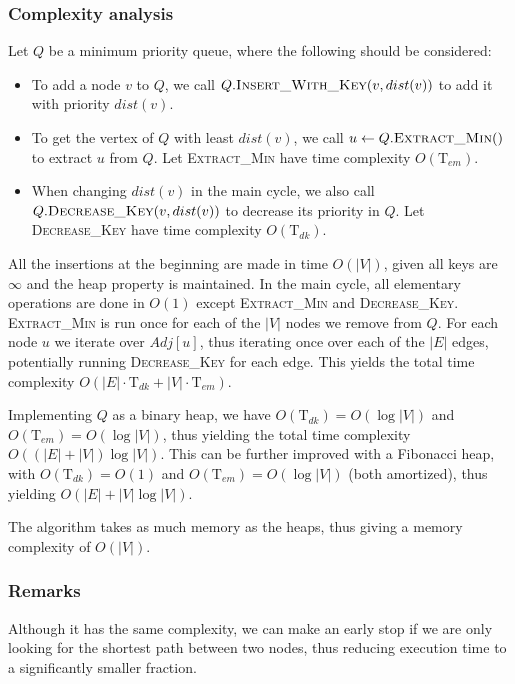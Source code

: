 \subsubsection{Complexity analysis}
Let $Q$ be a minimum priority queue, where the following should be considered:
\begin{itemize}
    \item To add a node $v$ to $Q$, we call $Q.\textsc{Insert\_With\_Key}(v, dist(v))$ to add it with priority $dist(v)$.
    \item To get the vertex of $Q$ with least $dist(v)$, we call $u \gets Q.\textsc{Extract\_Min}()$ to extract $u$ from $Q$. Let \textsc{Extract\_Min} have time complexity $O(\text{T}_{em})$.
    \item When changing $dist(v)$ in the main cycle, we also call $Q.\textsc{Decrease\_Key}(v, dist(v))$ to decrease its priority in $Q$. Let \textsc{Decrease\_Key} have time complexity $O(\text{T}_{dk})$.
\end{itemize}
All the insertions at the beginning are made in time $O(|V|)$, given all keys are $\infty$ and the heap property is maintained. In the main cycle, all elementary operations are done in $O(1)$ except \textsc{Extract\_Min} and \textsc{Decrease\_Key}. \textsc{Extract\_Min} is run once for each of the $|V|$ nodes we remove from $Q$. For each node $u$ we iterate over $Adj[u]$, thus iterating once over each of the $|E|$ edges, potentially running \textsc{Decrease\_Key} for each edge. This yields the total time complexity $O(|E|\cdot \text{T}_{dk}+|V|\cdot \text{T}_{em})$. \par
Implementing $Q$ as a binary heap, we have $O(\text{T}_{dk})=O(\log |V|)$ and $O(\text{T}_{em})=O(\log |V|)$, thus yielding the total time complexity $O((|E|+|V|)\log |V|)$. This can be further improved with a Fibonacci heap, with $O(\text{T}_{dk})=O(1)$ and $O(\text{T}_{em})=O(\log |V|)$ (both amortized), thus yielding $O(|E| + |V|\log |V|)$.\par
The algorithm takes as much memory as the heaps, thus giving a memory complexity of $O(|V|)$.
\subsubsection{Remarks} \label{alg:dijkstra-early-stop}
Although it has the same complexity, we can make an early stop if we are only looking for the shortest path between two nodes, thus reducing execution time to a significantly smaller fraction.
